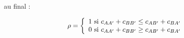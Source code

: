 au final :

\begin{equation}
\rho = \left \{
\begin{array}{r c l}
	1\ \text{si}\ c_{AA^\prime} + c_{BB^\prime} \leq c_{AB^\prime} + c_{BA^\prime} \\
	0\ \text{si}\ c_{AA^\prime} + c_{BB^\prime} \geq c_{AB^\prime} + c_{BA^\prime} \\
\end{array}
\right .
\end{equation}




